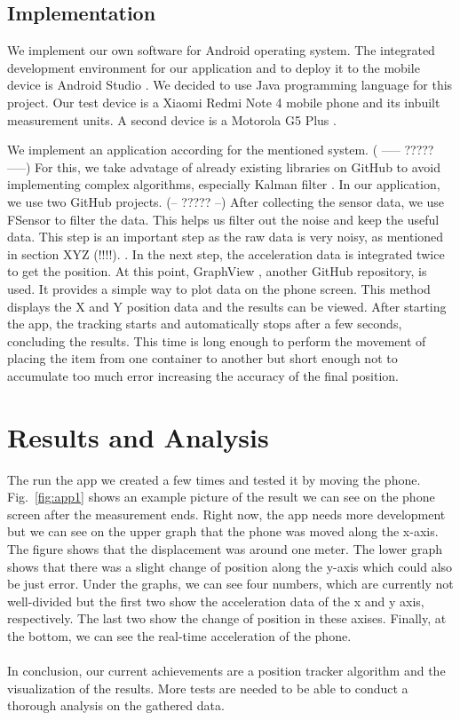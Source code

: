 \documentclass[12pt,twoside, hidelinks]{article}
\begin{document}
\subsection{Implementation}
\label{sect:implementation}
We implement our own software for Android operating system\cite{Android}. The integrated development environment for our application and to deploy it to the mobile device is Android Studio \cite{Android_Studio} . We decided to use Java programming language \cite{Java} for this project. Our test device is a Xiaomi Redmi Note 4 mobile phone \cite{Redmi_Note4} and its inbuilt measurement units. A second device is a Motorola G5 Plus \cite{motoG5}.

We implement an application according for the mentioned system. ( ----- ????? -----) For this, we  take advatage of already existing libraries on GitHub to avoid implementing complex algorithms, especially Kalman filter \cite{Kalman_filter_book}. In our application, we use two GitHub \cite{github} projects. (-- ????? --) After collecting the sensor data, we use FSensor \cite{KalebKE_2018} to filter the data. This helps us filter out the noise and keep the useful data. This step is an important step as the raw data is very noisy, as mentioned in section XYZ (!!!!). . In the next step, the acceleration data is integrated twice to get the position. At this point, GraphView \cite{Graphview}, another GitHub repository, is used. It provides a simple way to plot data on the phone screen. This method displays the X and Y position data and the results can be viewed. After starting the app, the tracking starts and automatically stops after a few seconds, concluding the results. This time is long enough to perform the movement of placing the item from one container to another but short enough not to accumulate too much error increasing the accuracy of the final position.

\section{Results and Analysis}
\label{sec:results}

The run the app we created a few times and tested it by moving the phone. Fig.~\ref{fig:app1} shows an example picture of the result we can see on the phone screen after the measurement ends. Right now, the app needs more development but we can see on the upper graph that the phone was moved along the x-axis. The figure shows that the displacement was around one meter. The lower graph shows that there was a slight change of position along the y-axis which could also be just error. Under the graphs, we can see four numbers, which are currently not well-divided but the first two show the acceleration data of the x and y axis, respectively. The last two show the change of position in these axises. Finally, at the bottom, we can see the real-time acceleration of the phone.
\\
\\
In conclusion, our current achievements are a position tracker algorithm and the visualization of the results. More tests are needed to be able to conduct a thorough analysis on the gathered data.
\end{document}
